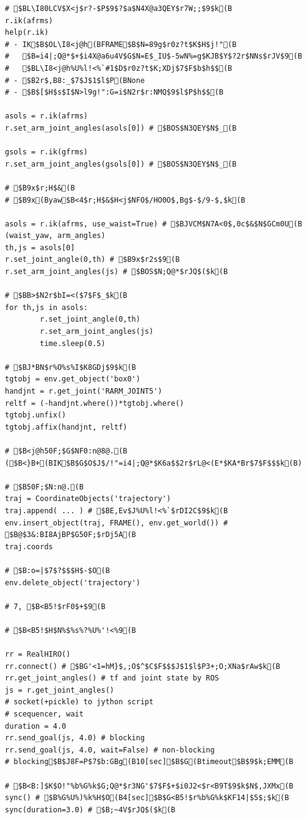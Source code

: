 \documentclass[11pt]{jreport}
\begin{document}
{{{{{{{{{{{{{\begin{verbatim}
# $BL\I80LCV$X<j$r?-$P$9$?$a$N4X@a3QEY$r7W;;$9$k(B
r.ik(afrms)
help(r.ik)
# - IK$B$OL\I8<j@h(BFRAME$B$N=89g$r0z?t$K$H$j!"(B
#   $B=i4|;Q@*$+$i4X@a6u4V$G$N=E$_IU$-5wN%=g$KJB$Y$?2r$NNs$rJV$9(B
#   $BL\I8<j@h%U%l!<%`#1$D$r0z?t$K;XDj$7$F$b$h$$(B
# - $B2r$,B8:_$7$J$1$l$P(BNone
# - $B$[$H$s$I$N>l9g!":G=i$N2r$r:NMQ$9$l$P$h$$(B

asols = r.ik(afrms)
r.set_arm_joint_angles(asols[0]) # $BOS$N3QEY$N$_(B

gsols = r.ik(gfrms)
r.set_arm_joint_angles(gsols[0]) # $BOS$N3QEY$N$_(B

# $B9x$r;H$&(B
# $B9x(Byaw$B<4$r;H$&$H<j$NFO$/HO0O$,Bg$-$/9-$,$k(B

asols = r.ik(afrms, use_waist=True) # $BJVCM$N7A<0$,0c$&$N$GCm0U(B (waist_yaw, arm_angles)
th,js = asols[0]
r.set_joint_angle(0,th) # $B9x$r2s$9(B
r.set_arm_joint_angles(js) # $BOS$N;Q@*$rJQ$($k(B

# $BB>$N2r$bI=<($7$F$_$k(B
for th,js in asols:
        r.set_joint_angle(0,th)
        r.set_arm_joint_angles(js)
        time.sleep(0.5)

# $BJ*BN$r%O%s%I$K8GDj$9$k(B
tgtobj = env.get_object('box0')
handjnt = r.get_joint('RARM_JOINT5')
reltf = (-handjnt.where())*tgtobj.where()
tgtobj.unfix()
tgtobj.affix(handjnt, reltf)

# $B<j@h50F;$G$NF0:n@8@.(B ($B<}B+(BIK$B$G$O$J$/!"=i4|;Q@*$K6a$$2r$rL@<(E*$KA*Br$7$F$$$k(B)

# $B50F;$N:n@.(B
traj = CoordinateObjects('trajectory')
traj.append( ... ) # $BE,Ev$J%U%l!<%`$rDI2C$9$k(B
env.insert_object(traj, FRAME(), env.get_world()) # $B@$3&:BI8AjBP$G50F;$rDj5A(B
traj.coords

# $B:o=|$7$?$$$H$-$O(B
env.delete_object('trajectory')

# 7, $B<B5!$rF0$+$9(B

# $B<B5!$H$N%$%s%?%U%'!<%9(B

rr = RealHIRO()
rr.connect() # $BG'<1=hM}$,;O$^$C$F$$$J$1$l$P3+;O;XNa$rAw$k(B
rr.get_joint_angles() # tf and joint state by ROS
js = r.get_joint_angles()
# socket(+pickle) to jython script
# scequencer, wait
duration = 4.0
rr.send_goal(js, 4.0) # blocking
rr.send_goal(js, 4.0, wait=False) # non-blocking
# blocking$B$J8F=P$7$b:GBg(B10[sec]$B$G(Btimeout$B$9$k;EMM(B

# $B<B:]$K$O!"%b%G%k$G;Q@*$r3NG'$7$F$+$i0J2<$r<B9T$9$k$N$,JXMx(B
sync() # $B%G%U%)%k%H$O(B4[sec]$B$G<B5!$r%b%G%k$KF14|$5$;$k(B
sync(duration=3.0) # $B;~4V$rJQ$($k(B


\end{verbatim}}}}}}}}}}}}}}
\end{document}
